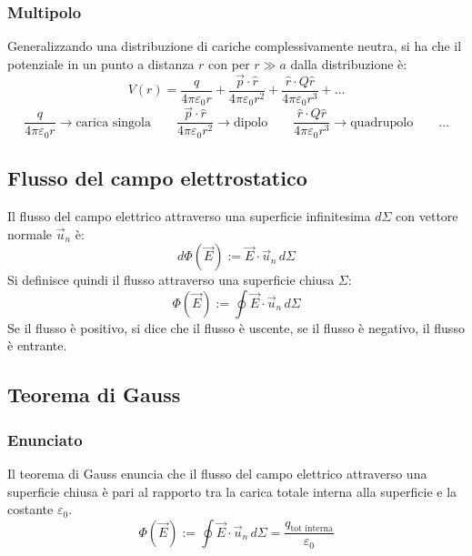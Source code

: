 \documentclass[a4paper]{article}
\newcommand\un{\vec{u}_n}
\begin{document}
\subsubsection*{Multipolo}
Generalizzando una distribuzione di cariche complessivamente neutra, si ha che il potenziale in un punto a distanza \(r\) con per
\(r \gg a\) dalla distribuzione è:
\[V(r) = \frac{q}{4 \pi \varepsilon_0 r} + \frac{\vec{p} \cdot \hat{r}}{4 \pi \varepsilon_0 r^2} + \frac{\hat{r} \cdot Q \hat{r}}{4 \pi \varepsilon_0 r^3} + \dots\]
\[\frac{q}{4 \pi \varepsilon_0 r} \rightarrow \text{carica singola} \qquad \frac{\vec{p} \cdot \hat{r}}{4 \pi \varepsilon_0 r^2} \rightarrow \text{dipolo} \qquad \frac{\hat{r} \cdot Q \hat{r}}{4 \pi \varepsilon_0 r^3} \rightarrow \text{quadrupolo} \qquad \dots\]

\newpage

\subsection{Flusso del campo elettrostatico}
Il flusso del campo elettrico attraverso una superficie infinitesima \(d\Sigma\) con vettore normale \(\un\) è:
\[d\Phi(\vec{E}) := \vec{E} \cdot \un \, d\Sigma\]
Si definisce quindi il flusso attraverso una superficie chiusa \(\Sigma\):
\[\Phi(\vec{E}) := \oint \vec{E} \cdot \un \, d\Sigma\]
Se il flusso è positivo, si dice che il flusso è uscente, se il flusso è negativo, il flusso è entrante.

\subsection{Teorema di Gauss}
\subsubsection*{Enunciato}
Il teorema di Gauss enuncia che il flusso del campo elettrico attraverso una superficie chiusa è pari al rapporto tra la carica
totale interna alla superficie e la costante \(\varepsilon_0\).
\[\Phi(\vec{E}) := \oint \vec{E} \cdot \un \, d\Sigma = \frac{q_\text{tot interna}}{\varepsilon_0}\]
\end{document}
